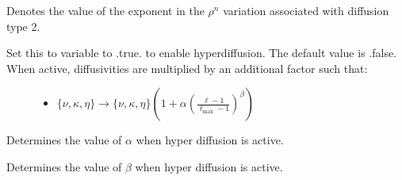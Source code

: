 \documentclass[letterpaper,11pt,english]{sphinxmanual}
\begin{document}
\begin{description}
\begin{description}
\end{description}

\item[{\sphinxstylestrong{\{nu,kappa,eta\}\_power}}] \leavevmode
\sphinxAtStartPar
Denotes the value of the exponent  in the \(\rho^{n}\) variation associated with diffusion type 2.

\item[{\sphinxstylestrong{hyperdiffusion}}] \leavevmode\begin{description}
\item[{Set this to variable to .true. to enable hyperdiffusion.  The default value is .false.  When active, diffusivities are multiplied by an additional factor such that:}] \leavevmode\begin{itemize}
\item {} 
\sphinxAtStartPar
\(\{\nu,\kappa,\eta\}\rightarrow\{\nu,\kappa,\eta\}\left(1+\alpha\left(\frac{\ell-1}{\ell_\mathrm{max}-1}\right)^\beta\right)\)

\end{itemize}

\end{description}

\item[{\sphinxstylestrong{hyperdiffusion\_alpha}}] \leavevmode
\sphinxAtStartPar
Determines the value of \(\alpha\) when hyper diffusion is active.

\item[{\sphinxstylestrong{hyperdiffusion\_beta}}] \leavevmode
\sphinxAtStartPar
Determines the value of \(\beta\) when hyper diffusion is active.

\end{description}



\renewcommand{\indexname}{Index}
\printindex
\end{document}
